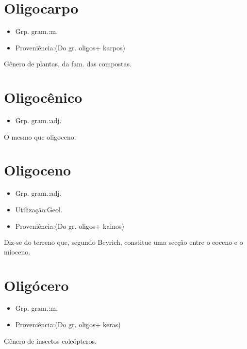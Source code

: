 \section{Oligocarpo}
\begin{itemize}
\item {Grp. gram.:m.}
\end{itemize}
\begin{itemize}
\item {Proveniência:(Do gr. \textunderscore oligos\textunderscore  + \textunderscore karpos\textunderscore )}
\end{itemize}
Gênero de plantas, da fam. das compostas.
\section{Oligocênico}
\begin{itemize}
\item {Grp. gram.:adj.}
\end{itemize}
O mesmo que \textunderscore oligoceno\textunderscore .
\section{Oligoceno}
\begin{itemize}
\item {Grp. gram.:adj.}
\end{itemize}
\begin{itemize}
\item {Utilização:Geol.}
\end{itemize}
\begin{itemize}
\item {Proveniência:(Do gr. \textunderscore oligos\textunderscore  + \textunderscore kainos\textunderscore )}
\end{itemize}
Diz-se do terreno que, segundo Beyrich, constitue uma secção entre o eoceno e o mioceno.
\section{Oligócero}
\begin{itemize}
\item {Grp. gram.:m.}
\end{itemize}
\begin{itemize}
\item {Proveniência:(Do gr. \textunderscore oligos\textunderscore  + \textunderscore keras\textunderscore )}
\end{itemize}
Gênero de insectos coleópteros.
